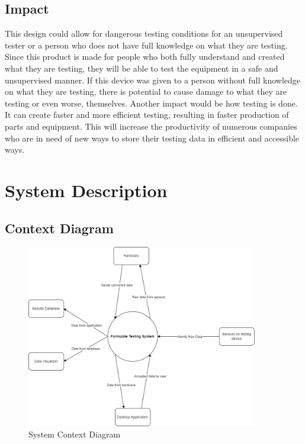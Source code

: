 \documentclass[12pt,titlepage]{article}
\begin{document}
\newpage

\subsection{Impact}
This design could allow for dangerous testing conditions for an unsupervised tester or a person who does not have full knowledge on what they are testing. Since this product is made for people who both fully understand and created what they are testing, they will be able to test the equipment in a safe and unsupervised manner. If this device was given to a person without full knowledge on what they are testing, there is potential to cause damage to what they are testing or even worse, themselves. Another impact would be how testing is done. It can create faster and more efficient testing, resulting in faster production of parts and equipment. This will increase the productivity of numerous companies who are in need of new ways to store their testing data in efficient and accessible ways.

\newpage

\section{System Description}

\subsection{Context Diagram}
\begin{figure}[h!]
\begin{center}
\includegraphics[width=0.9\textwidth]{sys_context_diagram}
\caption{System Context Diagram}
\label{Fig_SystemContext} 
\end{center}
\end{figure}
\newpage
\end{document}
